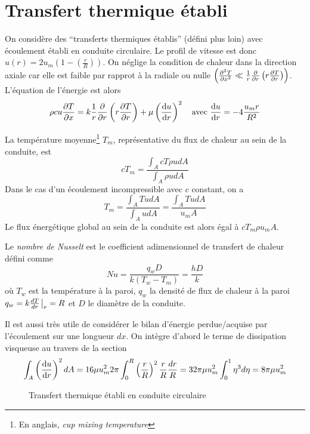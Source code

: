   \section{Transfert thermique établi}
    On considère des ``transferts thermiques établis'' (défini plus loin) avec écoulement établi en conduite circulaire. Le profil de vitesse est donc $u(r) = 2 u_m \left(1 - \left(\frac{r}{R}\right)\right)$. On néglige la condition de chaleur dans la direction axiale car elle est faible par rapprot à la radiale ou nulle $\left(\pdv[2]{T}{x} \ll \frac{1}{r}\pdv{r}\left(r\pdv{T}{r}\right)\right)$. L'équation de l'énergie est alors
    \begin{equation}
      \rho c u \pdv{T}{x} = k \frac{1}{r}\pdv{r} \left(r\pdv{T}{r}\right) + \mu \left(\dv{u}{r}\right)^2 \quad \textrm{avec } \dv{u}{r} = -4\frac{u_mr}{R^2}
    \end{equation}

    La température moyenne\footnote{En anglais, \textit{cup mixing temperature}} $T_m$, représentative du flux de chaleur au sein de la conduite, est
    \begin{equation}
      cT_m = \frac{\int_A c T \rho u dA}{\int_A \rho u dA}
    \end{equation}
    Dans le cas d'un écoulement incompressible avec $c$ constant, on a
    \begin{equation}
      T_m = \frac{\int_A T u dA}{\int_A u dA} = \frac{\int_A T u dA}{u_m A}
    \end{equation}
    Le flux énergétique global au sein de la conduite est alors égal à $c T_m \rho u_m A$.

    Le \textit{nombre de Nusselt} est le coefficient adimensionnel de transfert de chaleur défini comme
    \begin{equation}
      Nu = \frac{q_w D}{k (T_w - T_m)} = \frac{h D}{k}
    \end{equation}
    où $T_w$ est la température à la paroi, $q_w$ la densité de flux de chaleur à la paroi $q_w = k \frac{dT}{dr}\eval_r=R$ et $D$ le diamètre de la conduite.

    Il est aussi très utile de considérer le bilan d'énergie perdue/acquise par l'écoulement sur une longueur $dx$. On intègre d'abord le terme de dissipation visqueuse au travers de la section
    \begin{equation}
      \int_A \left(\dv{u}{r}\right)^2 dA = 16 \mu u_m^2 2\pi \int_0^R \left(\frac{r}{R}\right)^2 \frac{r}{R} \frac{dr}{R} = 32 \pi\mu u_m^2 \int_0^1 \eta^3 d\eta = 8 \pi \mu u_m^2
    \end{equation}
    \begin{figure}[!h]
      \centering
      
      \caption{Transfert thermique établi en conduite circulaire}
      \label{fig:transthermCond}
    \end{figure}

